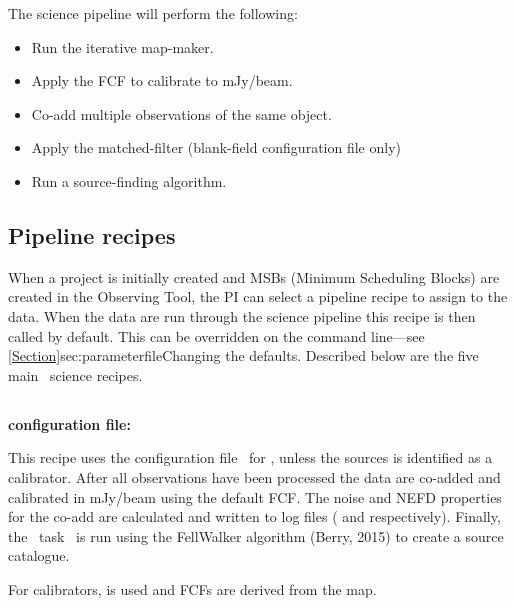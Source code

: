 The science pipeline will perform the following:
\vspace{-0.3cm}
\begin{itemize}\itemsep-0.3em
\item Run the iterative map-maker.
\item Apply the FCF to calibrate to mJy/beam.
\item Co-add multiple observations of the same object.
\item Apply the matched-filter (blank-field configuration file only)
\item Run a source-finding algorithm.
\end{itemize}

\subsection{Pipeline recipes}
\label{sec:recipes}

When a project is initially created and MSBs (Minimum Scheduling Blocks)
are created in the Observing Tool, the PI can select a pipeline recipe to assign
to the data. When the data are run through the science pipeline this
recipe is then called by default. This can be overridden on the command
line---see \cref{Section}{sec:parameterfile}{Changing the defaults}.
Described below are the five main \oracdr\ science recipes.

\subsection{}

\textbf{configuration file: }

This recipe uses the configuration file \jsageneric\ for \makemap, unless
the sources is identified as a calibrator. After all observations have
been processed the data are co-added and calibrated in mJy/beam using
the default FCF. The noise and NEFD properties for the co-add are
calculated and written to log files ( and
 respectively). Finally, the \cupid\ task \findclumps\
is run using the FellWalker algorithm (Berry, 2015\cite{fellwalker}) to
create a source catalogue.

For calibrators,  is used and
FCFs are derived from the map.


\subsection{}

